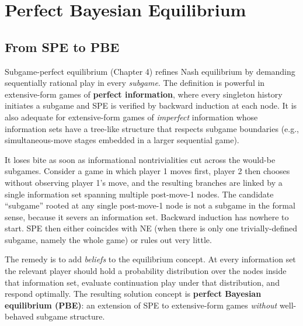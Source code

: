 \chapter{Perfect Bayesian Equilibrium}

\section{From SPE to PBE}

Subgame-perfect equilibrium (Chapter 4) refines Nash equilibrium by demanding sequentially rational play in every \emph{subgame}. The definition is powerful in extensive-form games of \textbf{perfect information}, where every singleton history initiates a subgame and SPE is verified by backward induction at each node. It is also adequate for extensive-form games of \emph{imperfect} information whose information sets have a tree-like structure that respects subgame boundaries (e.g., simultaneous-move stages embedded in a larger sequential game).

It loses bite as soon as informational nontrivialities cut across the would-be subgames. Consider a game in which player 1 moves first, player 2 then chooses without observing player 1's move, and the resulting branches are linked by a single information set spanning multiple post-move-1 nodes. The candidate ``subgame'' rooted at any single post-move-1 node is not a subgame in the formal sense, because it severs an information set. Backward induction has nowhere to start. SPE then either coincides with NE (when there is only one trivially-defined subgame, namely the whole game) or rules out very little.

The remedy is to add \emph{beliefs} to the equilibrium concept. At every information set the relevant player should hold a probability distribution over the nodes inside that information set, evaluate continuation play under that distribution, and respond optimally. The resulting solution concept is \textbf{perfect Bayesian equilibrium (PBE)}: an extension of SPE to extensive-form games \emph{without} well-behaved subgame structure.



